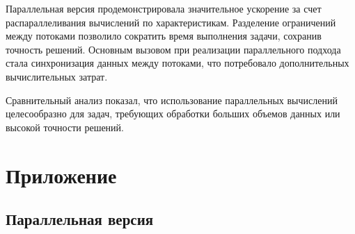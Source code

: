 \documentclass[a4paper,12pt]{article}
\begin{document}
Параллельная версия продемонстрировала значительное ускорение за счет распараллеливания вычислений по характеристикам. Разделение ограничений между потоками позволило сократить время выполнения задачи, сохранив точность решений. Основным вызовом при реализации параллельного подхода стала синхронизация данных между потоками, что потребовало дополнительных вычислительных затрат.

Сравнительный анализ показал, что использование параллельных вычислений целесообразно для задач, требующих обработки больших объемов данных или высокой точности решений.

\newpage
\section*{Приложение}
\subsection*{Параллельная версия}
\end{document}
